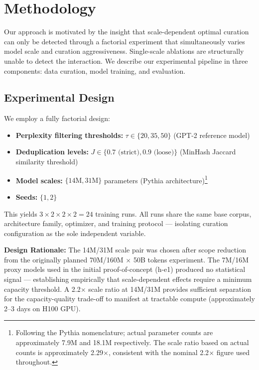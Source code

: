 \section{Methodology}
\label{sec:methodology}

Our approach is motivated by the insight that scale-dependent optimal curation can only be detected through a factorial experiment that simultaneously varies model scale and curation aggressiveness. Single-scale ablations are structurally unable to detect the interaction. We describe our experimental pipeline in three components: data curation, model training, and evaluation.

\subsection{Experimental Design}

We employ a fully factorial design:

\begin{itemize}
\item \textbf{Perplexity filtering thresholds:} $\tau \in \{20, 35, 50\}$ (GPT-2 reference model)
\item \textbf{Deduplication levels:} $J \in \{0.7 \text{ (strict)}, 0.9 \text{ (loose)}\}$ (MinHash Jaccard similarity threshold)
\item \textbf{Model scales:} $\{14\text{M}, 31\text{M}\}$ parameters (Pythia architecture)\footnote{Following the Pythia nomenclature; actual parameter counts are approximately 7.9M and 18.1M respectively. The scale ratio based on actual counts is approximately 2.29$\times$, consistent with the nominal 2.2$\times$ figure used throughout.}
\item \textbf{Seeds:} $\{1, 2\}$
\end{itemize}

This yields $3 \times 2 \times 2 \times 2 = 24$ training runs. All runs share the same base corpus, architecture family, optimizer, and training protocol --- isolating curation configuration as the sole independent variable.

\textbf{Design Rationale:} The 14M/31M scale pair was chosen after scope reduction from the originally planned 70M/160M $\times$ 50B tokens experiment. The 7M/16M proxy models used in the initial proof-of-concept (h-e1) produced no statistical signal --- establishing empirically that scale-dependent effects require a minimum capacity threshold. A 2.2$\times$ scale ratio at 14M/31M provides sufficient separation for the capacity-quality trade-off to manifest at tractable compute (approximately 2--3 days on H100 GPU).

